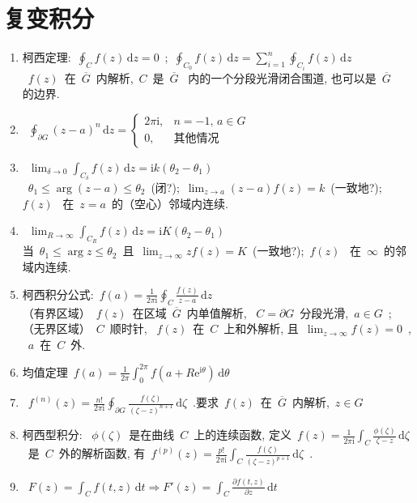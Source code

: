 \documentclass[11pt,a4paper]{article}
\newcommand\diff{\,\mathrm{d}}
\renewcommand{\m}[1]{~$\displaystyle#1$~}
\newcommand{\p}[2]{\ensuremath{\frac{\partial #1}{\partial #2}}}
\newcommand\mi{\mathrm{i}}
\newcommand\e{\mathrm{e}}
\begin{document}
  \section{复变积分}
    \begin{enumerate}
      \item 柯西定理:\m{\oint_Cf(z)\diff z = 0};\m{\oint_{C_0}f(z)\diff z = \sum_{i=1}^{n}\oint_{C_i}f(z) \diff z}\\
        \m{f(z)}在\m{\overline{G}}内解析,\m{C}是\m{\overline{G}} 内的一个分段光滑闭合围道, 也可以是\m{\overline{G}} 的边界.
      \item \m{\oint_{\partial G}(z-a)^n\diff z = \begin{cases}2\pi\mi,&n = -1,\,a\in G\\0,&\mbox{其他情况}\end{cases}}
      \item \m{\lim_{\delta\to0}\int_{C_\delta}f(z)\diff z = \mi k\left(\theta_2 - \theta_1\right)}\\
        \m{\theta_1\leq\arg\left(z-a\right)\leq\theta_2}(闭?);\m{\lim_{z\to a}\left(z-a\right)f(z) = k}(一致地?);\m{f(z)} 在\m{z = a}的（空心）邻域内连续.
      \item \m{\lim_{R\to\infty}\int_{C_R}f(z)\diff z = \mi K\left(\theta_2 - \theta_1\right)}\\
        当\m{\theta_1\leq\arg z\leq\theta_2}且\m{\lim_{z\to \infty}zf(z) = K}(一致地?);\m{f(z)} 在\m{\infty}的邻域内连续.
      \item 柯西积分公式:\m{f(a) = \frac 1{2\pi\mi}\oint_C \frac{f(z)}{z-a}\diff z}\\
        （有界区域）\m{f(z)}在区域\m{\overline{G}}内单值解析, \m{C = \partial G}分段光滑,\m{a\in G};\\
        （无界区域）\m{C}顺时针, \m{f(z)}在\m{C}上和外解析, 且\m{\lim_{z\to\infty} f(z) = 0}, \m{a}在\m{C}外.
      \item 均值定理\m{f(a) = \frac 1{2\pi}\int_0^{2\pi}f(a+R\e^{\mi\theta})\diff\theta}
      \item \m{f^{(n)}(z) = \frac{n!}{2\pi\mi}\oint_{\partial G}\frac{f(\zeta)}{(\zeta - z)^{n+1}}\diff \zeta}.要求\m{f(z)}在\m{\overline G}内解析,\m{z\in G}
      \item 柯西型积分: \m{\phi(\zeta)}是在曲线\m{C}上的连续函数, 定义\m{f(z) = \frac 1{2\pi\mi}\int_C\frac{\phi(\zeta)}{\zeta-z}\diff \zeta}是\m{C}外的解析函数, 有\m{f^{(p)}(z) = \frac{p!}{2\pi\mi}\int_C\frac{f(\zeta)}{(\zeta - z)^{p+1}}\diff \zeta}.
      \item \m{F(z) = \int_C f(t,z)\diff t\Rightarrow F'(z) = \int_C \p{f(t,z)}{z}\diff t}\\

\end{enumerate}
\end{document}
